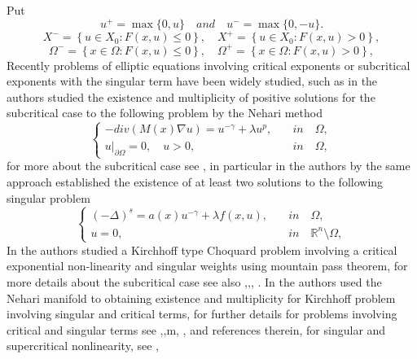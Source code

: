 \documentclass[10pt,twoside,reqno,centertags,draft]{amsart}
\begin{document}
Put
\begin{equation*}
u^+ =\max\{0, u\} \quad \textit{and} \quad u^- =\max\{0, -u\}.
\end{equation*}
\begin{equation*}
X^{-}=\left\lbrace  u \in X_0 : F(x,u) \leq 0 \right\rbrace, \quad X^{+} =\left\lbrace  u \in X_0 : F(x,u) > 0 \right\rbrace,
\end{equation*}
\begin{equation*}
\Omega^{-} =\left\lbrace  x \in \Omega : F(x,u) \leq 0 \right\rbrace, \quad \Omega^{+} =\left\lbrace  x \in \Omega : F(x,u) > 0 \right\rbrace,
\end{equation*}
Recently problems of elliptic equations involving critical exponents or subcritical exponents with the singular term have been widely studied, such as in \cite{saoudi2017multiplicity} the authors studied the existence and multiplicity of positive solutions for the subcritical case to the following problem by the Nehari method
\begin{equation}
\begin{cases}
-div\left( M(x)\nabla u\right) =u^{-\gamma} +\lambda u^{p}, & \quad \textit{in} \quad \Omega,\\
u\vert_{\partial \Omega} = 0, \quad u > 0, & \quad \textit{in}  \quad \Omega, 
\end{cases}
\end{equation} 
for more about the subcritical case see \cite{hirano2004existence}, in particular in \cite{ghanmi2016nehari} the authors by the same approach established the existence of at least two solutions to the following singular problem
\begin{equation}
\begin{cases}
\left(-\Delta\right)^{s} =a(x)u^{-\gamma} +\lambda f(x,u), & \quad \textit{in} \quad \Omega,\\
u = 0, & \quad \textit{in} \quad \mathbb{R}^n\setminus\Omega,
\end{cases}
\end{equation}
In \cite{arora2020polyharmonic} the authors studied a Kirchhoff type Choquard problem involving a critical exponential non-linearity and singular weights using mountain pass theorem, for more details about the subcritical case see also \cite{arcoya2014multiplicity},\cite{godoy2017multiplicity},\cite{choi2019existence},
\cite{figueiredo2012multiplicity}. In \cite{fiscella2019nehari} the authors used the Nehari manifold to obtaining existence and multiplicity for Kirchhoff problem involving singular and critical terms, for further details for problems involving critical and singular terms see \cite{giacomoni2009multiplicity},\cite{lei2015multiple},\cite{mukherjee2016fractional}\cite{giacomoni2017positive}m\cite{fiscella2019fractional}, \cite{autuori2015stationary}, \cite{giacomoni2009multiplicity} and references therein, for singular and supercritical nonlinearity, see \cite{boccardo2012dirichlet},
\end{document}
